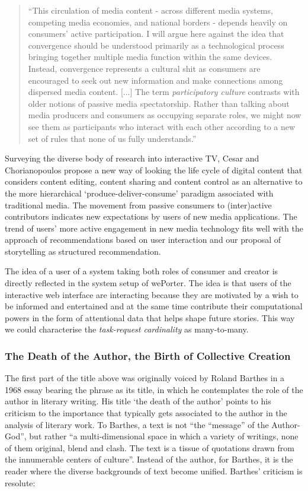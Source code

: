 \begin{quote}
  ``This circulation of media content - across different media systems, competing media economies, and national borders - depends heavily on consumers' active participation. I will argue here against the idea that convergence should be understood primarily as a technological process bringing together multiple media function within the same devices. Instead, convergence represents a cultural shit as consumers are encouraged to seek out new information and make connections among dispersed media content. [...] The term \emph{participatory culture} contrasts with older notions of passive media spectatorship. Rather than talking about media producers and consumers as occupying separate roles, we might now see them as participants who interact with each other according to a new set of rules that none of us fully understands.''\cite{jenkins2006convergence}
\end{quote}

Surveying the diverse body of research into interactive TV, Cesar and Chorianopoulos propose a new way of looking the life cycle of digital content that considers content editing, content sharing and content control as an alternative to the more hierarchical `produce-deliver-consume' paradigm associated with traditional media\cite{Cesar:2009fk}. The movement from passive consumers to (inter)active contributors indicates new expectations by users of new media applications. The trend of users' more active engagement in new media technology fits well with the approach of recommendations based on user interaction and our proposal of storytelling as structured recommendation.

The idea of a user of a system taking both roles of consumer and creator is directly reflected in the system setup of wePorter. The idea is that users of the interactive web interface are interacting because they are motivated by a wish to be informed and entertained and at the same time contribute their computational powers in the form of attentional data that helps shape future stories. This way we could characterise the \emph{task-request cardinality} as many-to-many.

\subsubsection{The Death of the Author, the Birth of Collective Creation}
The first part of the title above was originally voiced by Roland Barthes in a 1968 essay bearing the phrase as its title, in which he contemplates the role of the author in literary writing\cite{Barthes:1977wq}. His title `the death of the author' points to his criticism to the importance that typically gets associated to the author in the analysis of literary work. To Barthes, a text is not ``the “message” of the Author-God'', but rather ``a multi-dimensional space in which a variety of writings, none of them original, blend and clash. The text is a tissue of quotations drawn from the innumerable centers of culture''. Instead of the author, for Barthes, it is the reader where the diverse backgrounds of text become unified. Barthes' criticism is resolute:

